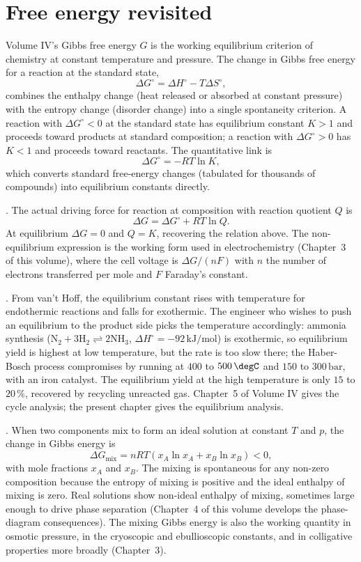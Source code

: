 \section{Free energy revisited}

Volume IV's Gibbs free energy $G$ is the working equilibrium criterion
of chemistry at constant temperature and pressure. The change in
Gibbs free energy for a reaction at the standard state,
\[
\Delta G^\circ = \Delta H^\circ - T \Delta S^\circ,
\]
combines the enthalpy change (heat released or absorbed at constant
pressure) with the entropy change (disorder change) into a single
spontaneity criterion. A reaction with $\Delta G^\circ < 0$ at the
standard state has equilibrium constant $K > 1$ and proceeds toward
products at standard composition; a reaction with $\Delta G^\circ > 0$
has $K < 1$ and proceeds toward reactants. The quantitative link is
\[
\Delta G^\circ = -RT \ln K,
\]
which converts standard free-energy changes (tabulated for thousands
of compounds) into equilibrium constants directly.

. The
actual driving force for reaction at composition with reaction
quotient $Q$ is
\[
\Delta G = \Delta G^\circ + RT \ln Q.
\]
At equilibrium $\Delta G = 0$ and $Q = K$, recovering the relation
above. The non-equilibrium expression is the working form used in
electrochemistry (Chapter~3 of this volume), where the cell voltage is
$\Delta G/(nF)$ with $n$ the number of electrons transferred per
mole and $F$ Faraday's constant.

. From van't Hoff, the equilibrium
constant rises with temperature for endothermic reactions and falls
for exothermic. The engineer who wishes to push an equilibrium to
the product side picks the temperature accordingly: ammonia synthesis
($\text{N}_2 + 3\text{H}_2 \rightleftharpoons 2\text{NH}_3$, $\Delta
H^\circ = -92\,\text{kJ}/\text{mol}$) is exothermic, so equilibrium
yield is highest at low temperature, but the rate is too slow there;
the Haber-Bosch process compromises by running at $400$ to $500\,
\degC$ and $150$ to $300\,\text{bar}$, with an iron catalyst. The
equilibrium yield at the high temperature is only $15$ to $20\,\%$,
recovered by recycling unreacted gas. Chapter~5 of Volume IV gives
the cycle analysis; the present chapter gives the equilibrium
analysis.

. When two components mix to form
an ideal solution at constant $T$ and $p$, the change in Gibbs energy
is
\[
\Delta G_{\text{mix}} = nRT(x_A \ln x_A + x_B \ln x_B) < 0,
\]
with mole fractions $x_A$ and $x_B$. The mixing is spontaneous for any
non-zero composition because the entropy of mixing is positive and
the ideal enthalpy of mixing is zero. Real solutions show non-ideal
enthalpy of mixing, sometimes large enough to drive phase separation
(Chapter~4 of this volume develops the phase-diagram consequences).
The mixing Gibbs energy is also the working quantity in osmotic
pressure, in the cryoscopic and ebullioscopic constants, and in
colligative properties more broadly (Chapter~3).

